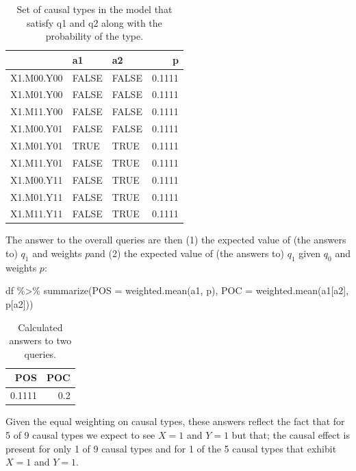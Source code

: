 \documentclass[
  12pt,
]{book}
\newenvironment{Shaded}{\begin{snugshade}}{\end{snugshade}}
\newcommand{\AttributeTok}[1]{\textcolor[rgb]{0.00,0.34,0.68}{#1}}
\newcommand{\FunctionTok}[1]{\textcolor[rgb]{0.39,0.29,0.61}{#1}}
\newcommand{\NormalTok}[1]{\textcolor[rgb]{0.12,0.11,0.11}{#1}}
\newcommand{\SpecialCharTok}[1]{\textcolor[rgb]{0.24,0.68,0.91}{#1}}
\begin{document}
\begin{table}

\caption{\label{tab:unnamed-chunk-4}Set of causal types in the model that satisfy q1 and q2 along with the probability of the type.}
\centering
\begin{tabular}[t]{lllr}
\toprule
  & a1 & a2 & p\\
\midrule
X1.M00.Y00 & FALSE & FALSE & 0.1111\\
X1.M01.Y00 & FALSE & FALSE & 0.1111\\
X1.M11.Y00 & FALSE & FALSE & 0.1111\\
X1.M00.Y01 & FALSE & FALSE & 0.1111\\
X1.M01.Y01 & TRUE & TRUE & 0.1111\\
\addlinespace
X1.M11.Y01 & FALSE & TRUE & 0.1111\\
X1.M00.Y11 & FALSE & TRUE & 0.1111\\
X1.M01.Y11 & FALSE & TRUE & 0.1111\\
X1.M11.Y11 & FALSE & TRUE & 0.1111\\
\bottomrule
\end{tabular}
\end{table}

The answer to the overall queries are then (1) the expected value of (the answers to) \(q_1\) and weights \(p\)and (2) the expected value of (the answers to) \(q_1\) given \(q_0\) and weights \(p\):

\begin{Shaded}
\begin{Highlighting}[]
\NormalTok{df }\SpecialCharTok{\%\textgreater{}\%} \FunctionTok{summarize}\NormalTok{(}\AttributeTok{POS =} \FunctionTok{weighted.mean}\NormalTok{(a1, p),}
                 \AttributeTok{POC =} \FunctionTok{weighted.mean}\NormalTok{(a1[a2], p[a2]))}
\end{Highlighting}
\end{Shaded}

\begin{table}

\caption{\label{tab:ch4pospoc}Calculated answers to two queries.}
\centering
\begin{tabular}[t]{rr}
\toprule
POS & POC\\
\midrule
0.1111 & 0.2\\
\bottomrule
\end{tabular}
\end{table}

Given the equal weighting on causal types, these answers reflect the fact that for 5 of 9 causal types we expect to see \(X=1\) and \(Y=1\) but that; the causal effect is present for only 1 of 9 causal types and for 1 of the 5 causal types that exhibit \(X=1\) and \(Y=1\).
\end{document}
